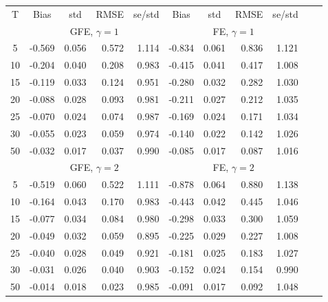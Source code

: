 \documentclass{article}
\begin{document}
 
\begin{tabular}{c r r r r r r r r r r} 
\toprule 
T & \multicolumn{1}{c}{ Bias } & \multicolumn{1}{c}{ std } & \multicolumn{1}{c}{ RMSE } & \multicolumn{1}{c}{ se/std } & \multicolumn{1}{c}{ Bias } & \multicolumn{1}{c}{ std } & \multicolumn{1}{c}{ RMSE } & \multicolumn{1}{c}{ se/std }\\[2pt]
 & \multicolumn{ 4 }{c}{ GFE, $\gamma=1$} & \multicolumn{ 4 }{c}{ FE, $\gamma=1$}\\[-3pt]
 \cmidrule(lr){2-5}  \cmidrule(lr){6-9}
5 &     -0.569 &      0.056 &      0.572 &      1.114 &     -0.834 &      0.061 &      0.836 &      1.121\\
10 &     -0.204 &      0.040 &      0.208 &      0.983 &     -0.415 &      0.041 &      0.417 &      1.008\\
15 &     -0.119 &      0.033 &      0.124 &      0.951 &     -0.280 &      0.032 &      0.282 &      1.030\\
20 &     -0.088 &      0.028 &      0.093 &      0.981 &     -0.211 &      0.027 &      0.212 &      1.035\\
25 &     -0.070 &      0.024 &      0.074 &      0.987 &     -0.169 &      0.024 &      0.171 &      1.034\\
30 &     -0.055 &      0.023 &      0.059 &      0.974 &     -0.140 &      0.022 &      0.142 &      1.026\\
50 &     -0.032 &      0.017 &      0.037 &      0.990 &     -0.085 &      0.017 &      0.087 &      1.016\\[0pt]
 & \multicolumn{ 4 }{c}{ GFE, $\gamma=2$} & \multicolumn{ 4 }{c}{ FE, $\gamma=2$}\\[-3pt]
 \cmidrule(lr){2-5}  \cmidrule(lr){6-9}
5 &     -0.519 &      0.060 &      0.522 &      1.111 &     -0.878 &      0.064 &      0.880 &      1.138\\
10 &     -0.164 &      0.043 &      0.170 &      0.983 &     -0.443 &      0.042 &      0.445 &      1.046\\
15 &     -0.077 &      0.034 &      0.084 &      0.980 &     -0.298 &      0.033 &      0.300 &      1.059\\
20 &     -0.049 &      0.032 &      0.059 &      0.895 &     -0.225 &      0.029 &      0.227 &      1.008\\
25 &     -0.040 &      0.028 &      0.049 &      0.921 &     -0.181 &      0.025 &      0.183 &      1.027\\
30 &     -0.031 &      0.026 &      0.040 &      0.903 &     -0.152 &      0.024 &      0.154 &      0.990\\
50 &     -0.014 &      0.018 &      0.023 &      0.985 &     -0.091 &      0.017 &      0.092 &      1.048\\[0pt]
\bottomrule 
\end{tabular}
\end{document}
